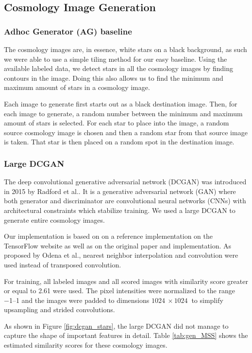 \documentclass[10pt,conference,compsocconf]{IEEEtran}
\begin{document}
\subsection{Cosmology Image Generation}
\subsubsection{Adhoc Generator (AG) baseline} %
The cosmology images are, in essence, white stars on a black background, as such we were able to use a simple tiling method for our easy baseline. Using the available labeled data, we detect stars in all the cosmology images by finding contours in the image. Doing this also allows us to find the minimum and maximum amount of stars in a cosmology image. 

Each image to generate first starts out as a black destination image. Then, for each image to generate, a random number between the minimum and maximum amount of stars is selected. For each star to place into the image, a random source cosmology image is chosen and then a random star from that source image is taken. That star is then placed on a random spot in the destination image.

\subsubsection{Large DCGAN} 
The deep convolutional generative adversarial network (DCGAN) was introduced in 2015 by Radford et al.\@ \cite{Radford}. It is a generative adversarial network (GAN) where both generator and discriminator are convolutional neural networks (CNNs) with architectural constraints which stabilize training. We used a large DCGAN to generate entire cosmology images. 

Our implementation is based on on a reference implementation on the TensorFlow website \cite{dcgantf} as well as on the original paper and implementation. As proposed by Odena et al.\@ \cite{Odena}, nearest neighbor interpolation and convolution were used instead of transposed convolution. 

For training, all labeled images and all scored images with similarity score greater or equal to \SI{2.61}{} were used. The pixel intensities were normalized to the range \SIrange{-1}{1}{} and the images were padded to dimensions $\SI{1024}{}\times\SI{1024}{}$ to simplify upsampling and strided convolutions. 

As shown in Figure \ref{fig:dcgan_stars}, the large DCGAN did not manage to capture the shape of important features in detail. Table \ref{tab:gen_MSS} shows the estimated similarity scores for these cosmology images.
\end{document}
